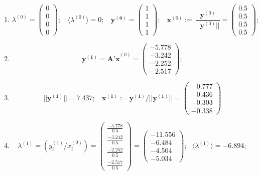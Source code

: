 \begin{enumerate}
\item $$
    \lambda^{(0)} =\begin{pmatrix}0\\0\\0\\0\end{pmatrix}; ~~~~
    \langle\lambda^{(0)}\rangle = 0;~~~~
    \mathbf{y^{(0)}} =\begin{pmatrix}1\\1\\1\\1\end{pmatrix};~~~~
    \mathbf{x}^{(0)}:=~\dfrac{\mathbf{y}^{(0)}}{||\mathbf{y}^{(0)}||} = \begin{pmatrix}0.5\\0.5\\0.5\\0.5\end{pmatrix};$$

\item $$
    \mathbf{y^{(1)} =A'x}^{(0)} = \begin{pmatrix}-5.778\\-3.242\\-2.252\\-2.517\end{pmatrix};$$

\item $$
    ||\mathbf{y^{(1)}}|| = 7.437; ~~~~
    \mathbf{x^{(1)}}:=\mathbf{y^{(1)}}/||\mathbf{y^{(1)}}|| =
    \begin{pmatrix}-0.777\\-0.436\\-0.303\\-0.338\end{pmatrix}$$

\item $$
    \lambda^{(1)} =\left( y^{(1)}_i / x^{(0)}_i \right) =
    \begin{pmatrix} \frac{-5.778}{0.5}\\\frac{-3.242}{0.5}\\\frac{-2.252}{0.5}\\\frac{-2.517}{0.5}\end{pmatrix}=
    \begin{pmatrix}-11.556\\-6.484\\-4.504\\-5.034\end{pmatrix}; ~~~
    \langle\lambda^{(1)}\rangle = -6.894;$$


\end{enumerate}
